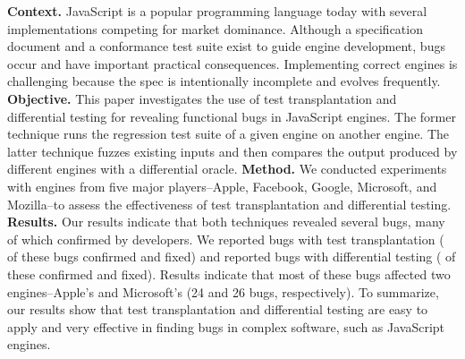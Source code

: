 \textbf{Context.}
JavaScript is a popular programming language today with several
implementations competing for market dominance. Although a
specification document and a conformance test suite exist to guide
engine development, bugs occur and have important practical
consequences. Implementing correct
engines is challenging because the spec is intentionally
incomplete and evolves frequently.
\textbf{Objective.}
This paper investigates the use of test transplantation and
differential testing for revealing functional bugs in JavaScript
engines.  The former technique runs the regression test suite of a
given engine on another engine.  The latter technique fuzzes existing
inputs and then compares the output produced by different engines with
a differential oracle.
\textbf{Method.}
We conducted experiments with engines from five major players--Apple,
Facebook, Google, Microsoft, and Mozilla--to assess the effectiveness
of test transplantation and differential testing.
\textbf{Results.}
Our results indicate that both techniques revealed several bugs, many of which
confirmed by developers. We reported \noBugsTransplantation{} bugs
with test transplantation (\noBugsTransplantationConfirmed{} of these bugs
confirmed and \noBugsTransplantationFixed{} fixed) and reported
\noBugsDifferentialTesting{} bugs with differential testing
(\noBugsDifferentialTestingConfirmed{} of these confirmed
and \noBugsDifferentialTestingFixed{} fixed). Results indicate that
most of these bugs affected two engines--Apple's
\jsc and Microsoft's \chakra{} (24 and 26 bugs, respectively).
To summarize, our results show that
test transplantation and differential testing
are easy to apply and very effective in
finding bugs in complex software, such as JavaScript engines.
